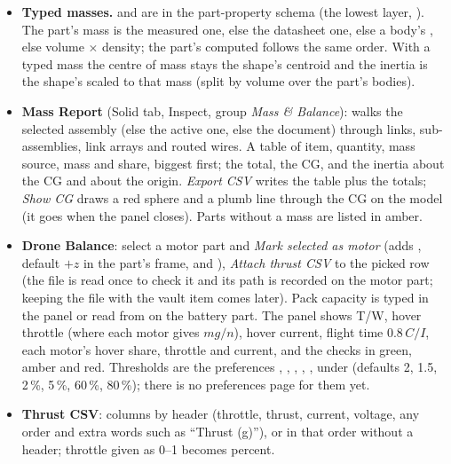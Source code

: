\begin{itemize}[nosep]
  \item \textbf{Typed masses.}  and  are in the part-property schema (the
        lowest layer, ). The part's mass is the measured one, else the datasheet one,
        else a body's , else volume $\times$ density; the part's computed  follows the
        same order. With a typed mass the centre of mass stays the shape's centroid and the inertia is the shape's
        scaled to that mass (split by volume over the part's bodies).
  \item \textbf{Mass Report} (Solid tab, Inspect, group \emph{Mass \& Balance}): walks the selected assembly (else the
        active one, else the document) through links, sub-assemblies, link arrays and routed wires. A table of item,
        quantity, mass source, mass and share, biggest first; the total, the CG, and the inertia about the CG and
        about the origin. \emph{Export CSV} writes the table plus the totals; \emph{Show CG} draws a red sphere and a
        plumb line through the CG on the model (it goes when the panel closes). Parts without a mass are listed in
        amber.
  \item \textbf{Drone Balance}: select a motor part and \emph{Mark selected as motor} (adds ,
        default $+z$ in the part's frame, and ), \emph{Attach thrust CSV} to the picked row (the file
        is read once to check it and its path is recorded on the motor part; keeping the file with the vault item
        comes later). Pack capacity is typed in the panel or read from  on the battery part. The
        panel shows T/W, hover throttle (where each motor gives $mg/n$), hover current, flight time $0.8\,C/I$, each
        motor's hover share, throttle and current, and the checks in green, amber and red. Thresholds are the
        preferences , , , ,
        ,  under  (defaults 2, 1.5, 2\,\%,
        5\,\%, 60\,\%, 80\,\%); there is no preferences page for them yet.
  \item \textbf{Thrust CSV}: columns by header (throttle, thrust, current, voltage, any order and extra words such as
        ``Thrust (g)''), or in that order without a header; throttle given as 0--1 becomes percent.
\end{itemize}

